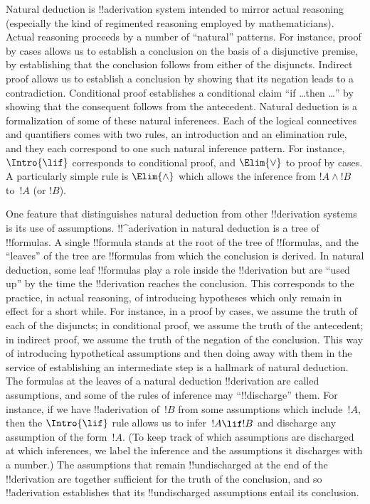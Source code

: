 

Natural deduction is !!a{derivation} system intended to mirror actual
reasoning (especially the kind of regimented reasoning employed by
mathematicians).  Actual reasoning proceeds by a number of ``natural''
patterns. For instance, proof by cases allows us to establish a
conclusion on the basis of a disjunctive premise, by establishing that
the conclusion follows from either of the disjuncts. Indirect proof
allows us to establish a conclusion by showing that its negation leads
to a contradiction. Conditional proof establishes a conditional claim
``if \dots then \dots'' by showing that the consequent follows from
the antecedent.  Natural deduction is a formalization of some of these
natural inferences.  Each of the logical connectives and quantifiers
comes with two rules, an introduction and an elimination rule, and
they each correspond to one such natural inference pattern. For
instance, $\Intro{\lif}$ corresponds to conditional proof, and
$\Elim{\lor}$ to proof by cases.  A particularly simple rule is
$\Elim{\land}$ which allows the inference from $!A \land !B$ to~$!A$
(or $!B$).

One feature that distinguishes natural deduction from other
!!{derivation} systems is its use of assumptions. !!^a{derivation} in
natural deduction is a tree of !!{formula}s.  A single !!{formula}
stands at the root of the tree of !!{formula}s, and the ``leaves'' of
the tree are !!{formula}s from which the conclusion is derived.  In
natural deduction, some leaf !!{formula}s play a role inside the
!!{derivation} but are ``used up'' by the time the !!{derivation}
reaches the conclusion. This corresponds to the practice, in actual
reasoning, of introducing hypotheses which only remain in effect for a
short while.  For instance, in a proof by cases, we assume the truth
of each of the disjuncts; in conditional proof, we assume the truth of
the antecedent; in indirect proof, we assume the truth of the negation
of the conclusion.  This way of introducing hypothetical assumptions
and then doing away with them in the service of establishing an
intermediate step is a hallmark of natural deduction. The formulas at
the leaves of a natural deduction !!{derivation} are called
assumptions, and some of the rules of inference may ``!!{discharge}''
them.  For instance, if we have !!a{derivation} of~$!B$ from some
assumptions which include~$!A$, then the $\Intro{\lif}$ rule allows us
to infer~$!A \lif !B$ and discharge any assumption of the form~$!A$.
(To keep track of which assumptions are discharged at which
inferences, we label the inference and the assumptions it discharges
with a number.)  The assumptions that remain !!{undischarged} at the
end of the !!{derivation} are together sufficient for the truth of the
conclusion, and so !!a{derivation} establishes that its
!!{undischarged} assumptions entail its conclusion.

